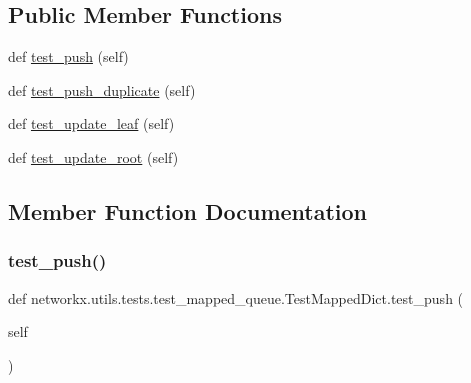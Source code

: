 \subsection*{Public Member Functions}
\begin{DoxyCompactItemize}
\item 
def \hyperlink{classnetworkx_1_1utils_1_1tests_1_1test__mapped__queue_1_1TestMappedDict_af20eeb4834cca5c09724195d0d5a129d}{test\+\_\+push} (self)
\item 
def \hyperlink{classnetworkx_1_1utils_1_1tests_1_1test__mapped__queue_1_1TestMappedDict_a2c8024b1585d5339c34b6e5d5285b0db}{test\+\_\+push\+\_\+duplicate} (self)
\item 
def \hyperlink{classnetworkx_1_1utils_1_1tests_1_1test__mapped__queue_1_1TestMappedDict_a0f6067664c159f9d09a31f5e4a303b81}{test\+\_\+update\+\_\+leaf} (self)
\item 
def \hyperlink{classnetworkx_1_1utils_1_1tests_1_1test__mapped__queue_1_1TestMappedDict_a7aa8fa06efe41a2b04cfea68ccfb47e1}{test\+\_\+update\+\_\+root} (self)
\end{DoxyCompactItemize}


\subsection{Member Function Documentation}
\mbox{\label{classnetworkx_1_1utils_1_1tests_1_1test__mapped__queue_1_1TestMappedDict_af20eeb4834cca5c09724195d0d5a129d}} 
\subsubsection{\texorpdfstring{test\+\_\+push()}{test\_push()}}
{\footnotesize\ttfamily def networkx.\+utils.\+tests.\+test\+\_\+mapped\+\_\+queue.\+Test\+Mapped\+Dict.\+test\+\_\+push (\begin{DoxyParamCaption}\item[{}]{self }\end{DoxyParamCaption})}

